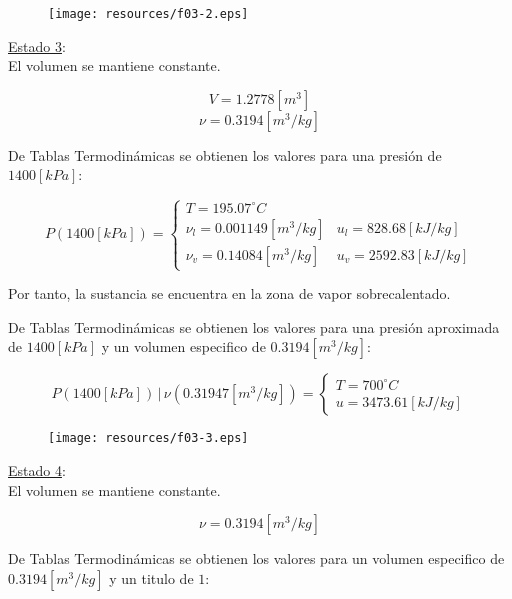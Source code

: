 \documentclass[letter,11pt]{article}
\begin{document}
\begin{enumerate}
\begin{figure}[H]
\centering
\texttt{[image: resources/f03-2.eps]}
\end{figure}

\underline{Estado 3}: \\
El volumen se mantiene constante.

\begin{equation*}
    V = 1.2778[m^3]
\end{equation*}
\begin{equation*}
    \nu = 0.3194[m^3/kg]
\end{equation*}

De Tablas Termodinámicas se obtienen los valores para una presión de
$1400[kPa]$:

\begin{equation*}
    P(1400[kPa]) = \begin{cases}
        T = 195.07^\circ C \\
        \nu_l = 0.001149[m^3/kg] & u_l = 828.68[kJ/kg] \\
        \nu_v = 0.14084[m^3/kg]  & u_v = 2592.83[kJ/kg]
    \end{cases}
\end{equation*}

Por tanto, la sustancia se encuentra en la zona de vapor sobrecalentado.

De Tablas Termodinámicas se obtienen los valores para una presión aproximada de
$1400[kPa]$ y un volumen especifico de $0.3194[m^3/kg]$:

\begin{equation*}
    P(1400[kPa])\,|\,\nu(0.31947[m^3/kg]) = \begin{cases}
        T = 700^\circ C \\
        u = 3473.61[kJ/kg]
    \end{cases}
\end{equation*}

\begin{figure}[H]
\centering
\texttt{[image: resources/f03-3.eps]}
\end{figure}

\underline{Estado 4}: \\
El volumen se mantiene constante.

\begin{equation*}
    \nu = 0.3194[m^3/kg]
\end{equation*}

De Tablas Termodinámicas se obtienen los valores para un volumen especifico de
$0.3194[m^3/kg]$ y un titulo de $1$:


\end{enumerate}
\end{document}
